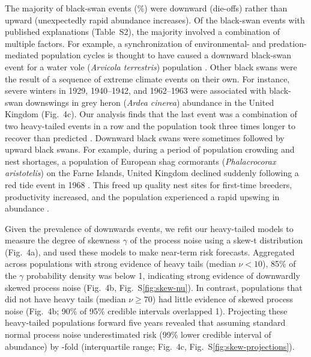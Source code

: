 The majority of black-swan events (\percBSDown \%) were downward (die-offs)
rather than upward (unexpectedly rapid abundance increases). Of the black-swan
events with published explanations (Table~S2), the majority involved
a combination of multiple factors. For example, a synchronization of
environmental- and predation-mediated population cycles is thought to have
caused a downward black-swan event for a water vole (\emph{Arvicola
terrestris}) population \citep{saucy1994}. Other black swans were the result of
a sequence of extreme climate events on their own. For instance, severe winters
in 1929, 1940--1942, and 1962--1963 were associated with black-swan downswings
in grey heron (\emph{Ardea cinerea}) abundance in the United
Kingdom \citep{stafford1971} (Fig.~4c). Our analysis finds that the last event
was a combination of two heavy-tailed events in a row and the population took
three times longer to recover than predicted \citep{stafford1971}. Downward black
swans were sometimes followed by upward black swans. For example, during
a period of population crowding and nest shortages, a population of European
shag cormorants (\emph{Phalacrocorax aristotelis}) on the Farne Islands, United
Kingdom declined suddenly following a red tide event in 1968 \citep{potts1980}.
This freed up quality nest sites for first-time breeders, productivity
increased, and the population experienced a rapid upswing in
abundance \citep{potts1980}.

Given the prevalence of downwards events, we refit our heavy-tailed models to
measure the degree of skewness \(\gamma\) of the process noise using a skew-t
distribution (Fig.~4a), and used these models to make near-term risk forecasts.
Aggregated across populations with strong evidence of heavy tails (median \(\nu
< 10\)), 85\% of the \(\gamma\) probability density was below 1, indicating
strong evidence of downwardly skewed process noise (Fig.~4b,
Fig.~S\ref{fig:skew-nu}). In contrast, populations that did not have heavy
tails (median \(\nu \geq 70\)) had little evidence of skewed process noise
(Fig.~4b; 90\% of 95\% credible intervals overlapped 1). Projecting these
heavy-tailed populations forward five years revealed that assuming standard
normal process noise underestimated risk (99\% lower credible interval of
abundance) by \crashUnderRange-fold (interquartile range; Fig.~4c,
Fig.~S\ref{fig:skew-projections}).


